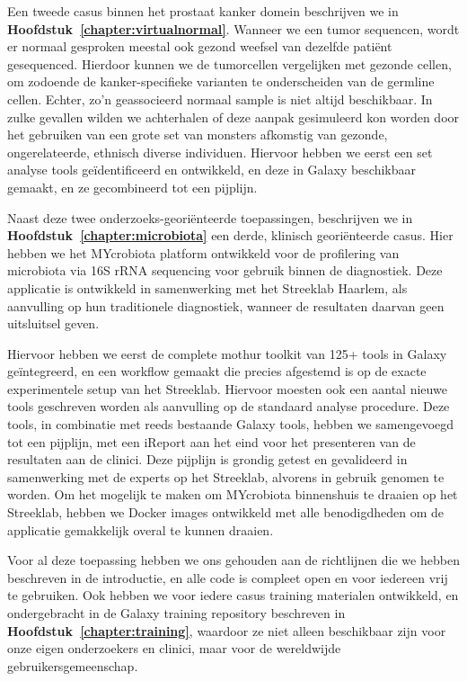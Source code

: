 Een tweede casus binnen het prostaat kanker domein beschrijven we in \textbf{Hoofdstuk~\ref{chapter:virtualnormal}}. Wanneer we een tumor sequencen, wordt er normaal gesproken meestal ook gezond weefsel van dezelfde patiënt gesequenced.
Hierdoor kunnen we de tumorcellen vergelijken met gezonde cellen, om zodoende de kanker-specifieke varianten te onderscheiden van de germline cellen.
Echter, zo'n geassocieerd normaal sample is niet altijd beschikbaar.
In zulke gevallen wilden we achterhalen of deze aanpak gesimuleerd kon worden door het gebruiken van een grote set van monsters afkomstig van gezonde, ongerelateerde, ethnisch diverse individuen.
Hiervoor hebben we eerst een set analyse tools geïdentificeerd en ontwikkeld, en deze in Galaxy beschikbaar gemaakt, en ze gecombineerd tot een pijplijn.

Naast deze twee onderzoeks-georiënteerde toepassingen, beschrijven we in \textbf{Hoofdstuk~\ref{chapter:microbiota}} een derde, klinisch georiënteerde casus. Hier hebben we het MYcrobiota platform ontwikkeld voor de profilering van microbiota via 16S rRNA sequencing voor gebruik binnen de diagnostiek.
Deze applicatie is ontwikkeld in samenwerking met het Streeklab Haarlem, als aanvulling op hun traditionele diagnostiek, wanneer de resultaten daarvan geen uitsluitsel geven.

Hiervoor hebben we eerst de complete mothur toolkit van 125+ tools in Galaxy geïntegreerd, en een workflow gemaakt die precies afgestemd is op de exacte experimentele setup van het Streeklab.
Hiervoor moesten ook een aantal nieuwe tools geschreven worden als aanvulling op de standaard analyse procedure.
Deze tools, in combinatie met reeds bestaande Galaxy tools, hebben we samengevoegd tot een pijplijn, met een iReport aan het eind voor het presenteren van de resultaten aan de clinici.
Deze pijplijn is grondig getest en gevalideerd in samenwerking met de experts op het Streeklab, alvorens in gebruik genomen te worden.
Om het mogelijk te maken om MYcrobiota binnenshuis te draaien op het Streeklab, hebben we Docker images ontwikkeld met alle benodigdheden om de applicatie gemakkelijk overal te kunnen draaien.

Voor al deze toepassing hebben we ons gehouden aan de richtlijnen die we hebben beschreven in de introductie, en alle code is compleet open en voor iedereen vrij te gebruiken. Ook hebben we voor iedere casus training materialen ontwikkeld, en ondergebracht in de Galaxy training repository beschreven in \textbf{Hoofdstuk~\ref{chapter:training}}, waardoor ze niet alleen beschikbaar zijn voor onze eigen onderzoekers en clinici, maar voor de wereldwijde gebruikersgemeenschap.


